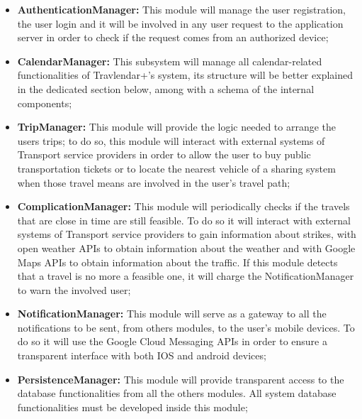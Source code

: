 \begin{itemize}
	\item \textbf{AuthenticationManager:} This module will manage the user registration, the user login and it will be involved in any user request to the application server in order to check if the request comes from an authorized device;
	\item \textbf{CalendarManager:} This subsystem will manage all calendar-related functionalities of Travlendar+'s system, its structure will be better explained in the dedicated section below, among with a schema of the internal components;
	\item \textbf{TripManager:} This module will provide the logic needed to arrange the users trips; to do so, this module will interact with external systems of Transport service providers in order to allow the user to buy public transportation tickets or to locate the nearest vehicle of a sharing system when those travel means are involved in the user's travel path;
	\item \textbf{ComplicationManager:} This module will periodically checks if the travels that are close in time are still feasible. To do so it will interact with external systems of Transport service providers to gain information about strikes, with open weather APIs to obtain information about the weather and with Google Maps APIs to obtain information about the traffic. If this module detects that a travel is no more a feasible one, it will charge the NotificationManager to warn the involved user;
	\item \textbf{NotificationManager:} This module will serve as a gateway to all the notifications to be sent, from others modules, to the user's mobile devices. To do so it will use the Google Cloud Messaging APIs in order to ensure a transparent interface with both IOS and android devices;
	\item \textbf{PersistenceManager:} This module will provide transparent access to the database functionalities from all the others modules. All system database functionalities must be developed inside this module;
\end{itemize}

